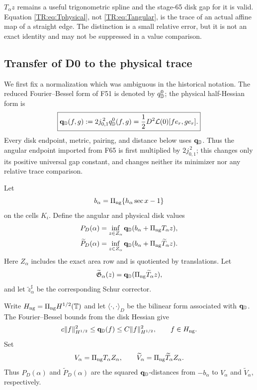 \begin{remark}
$T_\alpha z$ remains a useful trigonometric spline and the stage-65 disk
gap for it is valid.  Equation \eqref{TR:eq:Tphysical}, not
\eqref{TR:eq:Tangular}, is the trace of an actual affine map of a straight
edge.  The distinction is a small relative error, but it is not an exact
identity and may not be suppressed in a value comparison.
\end{remark}

\subsection{Transfer of D0 to the physical trace}

We first fix a normalization which was ambiguous in the historical
notation.  The reduced Fourier--Bessel form of F51 is denoted by
$q_{\mathbb D}^{0}$; the physical half-Hessian form is
\begin{equation}\label{TR:eq:physical-disk-normalization}
 \boxed{\mathbf q_{\mathbb D}(f,g):=2j_{0,1}^{\,2}q_{\mathbb D}^{0}(f,g)
 =\frac12D^2\mathcal L(0)[fe_r,ge_r].}
\end{equation}
Every disk endpoint, metric, pairing, and distance below uses $\mathbf q_{\mathbb D}$.
Thus the angular endpoint imported from F65 is first multiplied by
$2j_{0,1}^{\,2}$; this changes only its positive universal gap constant,
and changes neither its minimizer nor any relative trace comparison.

Let
\begin{equation}\label{TR:eq:source}
 b_\alpha=\Pi_{\rm ng}\{h_\alpha\sec x-1\}
\end{equation}
on the cells $K_i$.  Define the angular and physical disk values
\begin{align}
 P_D(\alpha)&=\inf_{z\in Z_\alpha}
 \mathbf q_{\mathbb D}(b_\alpha+\Pi_{\rm ng} T_\alpha z),\label{TR:eq:PD}\\
 \widetilde P_D(\alpha)&=\inf_{z\in Z_\alpha}
 \mathbf q_{\mathbb D}(b_\alpha+\Pi_{\rm ng}\widetilde T_\alpha z).
 \label{TR:eq:PDphysical}
\end{align}
Here $Z_\alpha$ includes the exact area row and is quotiented by
translations.  Let
\begin{equation}\label{TR:eq:Gphysical}
 \widetilde{\mathfrak G}_\alpha(z)
 =\mathbf q_{\mathbb D}(\Pi_{\rm ng}\widetilde T_\alpha z),
\end{equation}
and let $\widetilde z_\alpha^\sharp$ be the corresponding Schur corrector.

Write $H_{\rm ng}=\Pi_{\rm ng} H^{1/2}(\mathbb T)$ and let
$\langle\cdot,\cdot\rangle_D$ be the bilinear form associated with
$\mathbf q_{\mathbb D}$.  The Fourier--Bessel bounds from the disk Hessian give
\begin{equation}\label{TR:eq:Bessel-coercivity}
 c\|f\|_{H^{1/2}}^2\le \mathbf q_{\mathbb D}(f)\le
 C\|f\|_{H^{1/2}}^2,\qquad f\in H_{\rm ng}.
\end{equation}
Set
\begin{equation}\label{TR:eq:trace-spaces}
 V_\alpha=\Pi_{\rm ng} T_\alpha Z_\alpha,\qquad
 \widetilde V_\alpha=\Pi_{\rm ng}\widetilde T_\alpha Z_\alpha.
\end{equation}
Thus $P_D(\alpha)$ and $\widetilde P_D(\alpha)$ are the squared
$\mathbf q_{\mathbb D}$-distances from $-b_\alpha$ to $V_\alpha$ and
$\widetilde V_\alpha$, respectively.

